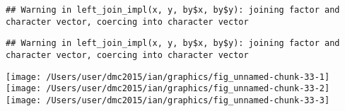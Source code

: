 \documentclass[10pt]{report}
\newenvironment{Shaded}{}{}
\newcommand{\KeywordTok}[1]{\textcolor[rgb]{0.00,0.44,0.13}{\textbf{{#1}}}}
\newcommand{\DataTypeTok}[1]{\textcolor[rgb]{0.56,0.13,0.00}{{#1}}}
\newcommand{\StringTok}[1]{\textcolor[rgb]{0.25,0.44,0.63}{{#1}}}
\newcommand{\NormalTok}[1]{{#1}}
\begin{document}
\begin{verbatim}
## Warning in left_join_impl(x, y, by$x, by$y): joining factor and character vector, coercing into character vector
\end{verbatim}

\begin{Shaded}
\end{Shaded}

\begin{verbatim}
## Warning in left_join_impl(x, y, by$x, by$y): joining factor and character vector, coercing into character vector
\end{verbatim}

\begin{Shaded}
\end{Shaded}

\begin{center}\texttt{[image: /Users/user/dmc2015/ian/graphics/fig\_unnamed-chunk-33-1]} \texttt{[image: /Users/user/dmc2015/ian/graphics/fig\_unnamed-chunk-33-2]} \texttt{[image: /Users/user/dmc2015/ian/graphics/fig\_unnamed-chunk-33-3]} \end{center}
\end{document}
